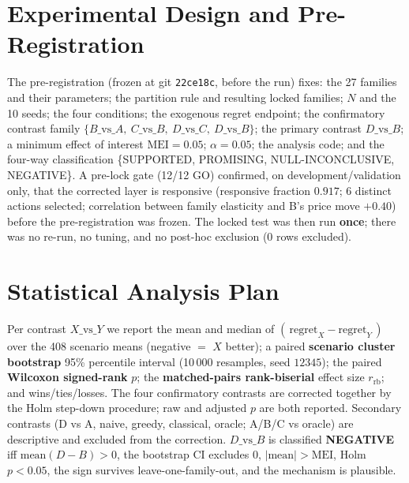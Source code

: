 \documentclass[10pt,twocolumn,a4paper]{article}
\newcommand{\code}[1]{\texttt{#1}}
\newcommand{\dvb}{\ensuremath{D\!-\!B}}
\newcommand{\rb}{\ensuremath{r_{\mathrm{rb}}}}
\begin{document}
\section{Experimental Design and Pre-Registration}\label{sec:design}
The pre-registration (frozen at git \code{22ce18c}, before the run) fixes: the
27 families and their parameters; the partition rule and resulting locked
families; $N$ and the 10 seeds; the four conditions; the exogenous regret
endpoint; the confirmatory contrast family
$\{B\text{\_vs\_}A,\ C\text{\_vs\_}B,\ D\text{\_vs\_}C,\ D\text{\_vs\_}B\}$;
the primary contrast $D\text{\_vs\_}B$; a minimum effect of interest
$\mathrm{MEI}=0.05$; $\alpha=0.05$; the analysis code; and the four-way
classification \{SUPPORTED, PROMISING, NULL-INCONCLUSIVE, NEGATIVE\}. A pre-lock
gate (12/12 GO) confirmed, on development/validation only, that the corrected
layer is responsive (responsive fraction $0.917$; 6 distinct actions selected;
correlation between family elasticity and B's price move $+0.40$) before the
pre-registration was frozen. The locked test was then run \textbf{once}; there
was no re-run, no tuning, and no post-hoc exclusion (0 rows excluded).

\section{Statistical Analysis Plan}\label{sec:stats}
Per contrast $X\text{\_vs\_}Y$ we report the mean and median of
$(\,\mathrm{regret}_X-\mathrm{regret}_Y\,)$ over the 408 scenario means
(negative $=$ $X$ better); a paired \textbf{scenario cluster bootstrap} 95\%
percentile interval (10\,000 resamples, seed $12345$); the paired
\textbf{Wilcoxon signed-rank} $p$; the \textbf{matched-pairs rank-biserial}
effect size \rb; and wins/ties/losses. The four confirmatory contrasts are
corrected together by the Holm step-down procedure; raw and adjusted $p$ are
both reported. Secondary contrasts (D vs A, naive, greedy, classical, oracle;
A/B/C vs oracle) are descriptive and excluded from the correction.
$D\text{\_vs\_}B$ is classified \textbf{NEGATIVE} iff
$\mathrm{mean}(\dvb)>0$, the bootstrap CI excludes $0$, $|\mathrm{mean}|>\mathrm{MEI}$,
Holm $p<0.05$, the sign survives leave-one-family-out, and the mechanism is
plausible.

\end{document}
